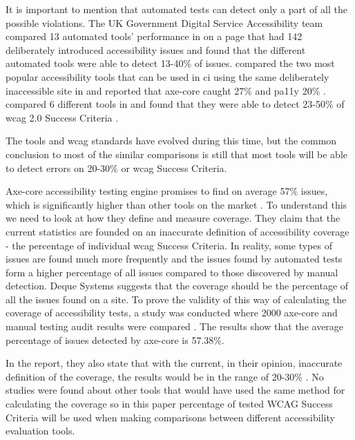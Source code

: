 \documentclass{master_thesis}
\begin{document}
It is important to mention that automated tests can detect only a part of all the possible violations. The UK Government Digital Service Accessibility team compared 13 automated tools' performance in \citeyear{GAT2018} on a page that had 142 deliberately introduced accessibility issues and found that the different automated tools were able to detect 13-40\% of issues. \citeauthor{Abbott2021} compared the two most popular accessibility tools that can be used in \ac{ci} using the same deliberately inaccessible site in \citeyear{Abbott2021} and reported that axe-core caught 27\% and pa11y 20\% \citep{Abbott2021}. \citeauthor{Vigo2013} compared 6 different tools in \citeyear{Vigo2013} and found that they were able to detect 23-50\% of  \ac{wcag} 2.0 Success Criteria \citep{GAT2018, Abbott2021, Vigo2013}.

The tools and \ac{wcag} standards have evolved during this time, but the common conclusion to most of the similar comparisons is still that most tools will be able to detect errors on 20-30\% or \ac{wcag} Success Criteria. 

Axe-core accessibility testing engine promises to find on average 57\% issues, which is significantly higher than other tools on the market \citep{Deque2023}. To understand this we need to look at how they define and measure coverage. They claim that the current statistics are founded on an inaccurate definition of accessibility coverage - the percentage of individual \ac{wcag} Success Criteria. In reality, some types of issues are found much more frequently and the issues found by automated tests form a higher percentage of all issues compared to those discovered by manual detection. Deque Systems suggests that the coverage should be the percentage of all the issues found on a site. To prove the validity of this way of calculating the coverage of accessibility tests, a study was conducted where 2000 axe-core and manual testing audit results were compared \citep{DequeSystems2021report}. The results show that the average percentage of issues detected by axe-core is 57.38\%.

In the report, they also state that with the current, in their opinion, inaccurate definition of the coverage, the results would be in the range of 20-30\% \citep{DequeSystems2021report}. No studies were found about other tools that would have used the same method for calculating the coverage so in this paper percentage of tested WCAG Success Criteria will be used when making comparisons between different accessibility evaluation tools.
\end{document}
